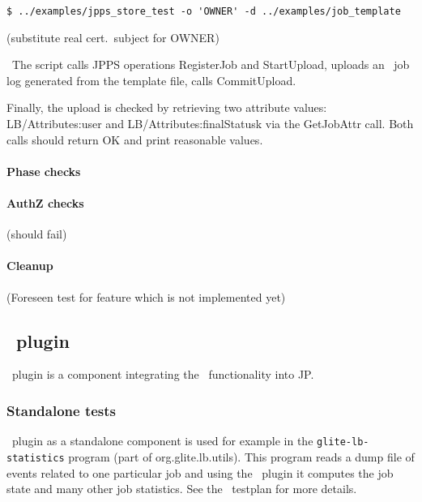 \begin{verbatim}
$ ../examples/jpps_store_test -o 'OWNER' -d ../examples/job_template
\end{verbatim}
(substitute real cert.\ subject for OWNER)

\result\ 
The script calls JPPS operations RegisterJob and StartUpload, 
uploads an \LB\ job log generated from the template file,
calls CommitUpload.

Finally, the upload is checked by retrieving two attribute
values: LB/Attributes:user and LB/Attributes:finalStatusk via the GetJobAttr
call. 
Both calls should return OK and print reasonable values.


\paragraph{Phase checks}

\paragraph{AuthZ checks}
(should fail)

%
%
%


\paragraph{Cleanup}
(Foreseen test for feature which is not implemented yet)

\subsection{\LB\ plugin}
\LB\ plugin is a component integrating the \LB\ functionality into JP.


\subsubsection{Standalone tests}
\LB\ plugin as a standalone component is used for example in the \texttt{glite-lb-statistics} 
program (part of org.glite.lb.utils). This program reads a dump file of events related to
one particular job and using the \LB\ plugin it computes the job state and many other job 
statistics. See the \LB\ testplan for more details.

